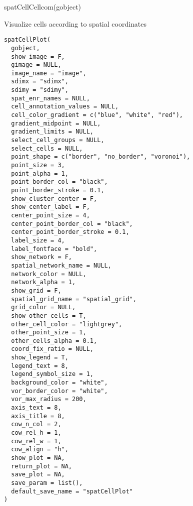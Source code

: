 \documentclass[a4paper]{book}
\begin{document}
%
\begin{Examples}
\begin{ExampleCode}
    spatCellCellcom(gobject)
\end{ExampleCode}
\end{Examples}
%
\begin{Description}\relax
Visualize cells according to spatial coordinates
\end{Description}
%
\begin{Usage}
\begin{verbatim}
spatCellPlot(
  gobject,
  show_image = F,
  gimage = NULL,
  image_name = "image",
  sdimx = "sdimx",
  sdimy = "sdimy",
  spat_enr_names = NULL,
  cell_annotation_values = NULL,
  cell_color_gradient = c("blue", "white", "red"),
  gradient_midpoint = NULL,
  gradient_limits = NULL,
  select_cell_groups = NULL,
  select_cells = NULL,
  point_shape = c("border", "no_border", "voronoi"),
  point_size = 3,
  point_alpha = 1,
  point_border_col = "black",
  point_border_stroke = 0.1,
  show_cluster_center = F,
  show_center_label = F,
  center_point_size = 4,
  center_point_border_col = "black",
  center_point_border_stroke = 0.1,
  label_size = 4,
  label_fontface = "bold",
  show_network = F,
  spatial_network_name = NULL,
  network_color = NULL,
  network_alpha = 1,
  show_grid = F,
  spatial_grid_name = "spatial_grid",
  grid_color = NULL,
  show_other_cells = T,
  other_cell_color = "lightgrey",
  other_point_size = 1,
  other_cells_alpha = 0.1,
  coord_fix_ratio = NULL,
  show_legend = T,
  legend_text = 8,
  legend_symbol_size = 1,
  background_color = "white",
  vor_border_color = "white",
  vor_max_radius = 200,
  axis_text = 8,
  axis_title = 8,
  cow_n_col = 2,
  cow_rel_h = 1,
  cow_rel_w = 1,
  cow_align = "h",
  show_plot = NA,
  return_plot = NA,
  save_plot = NA,
  save_param = list(),
  default_save_name = "spatCellPlot"
)
\end{verbatim}
\end{Usage}
%
\end{document}
